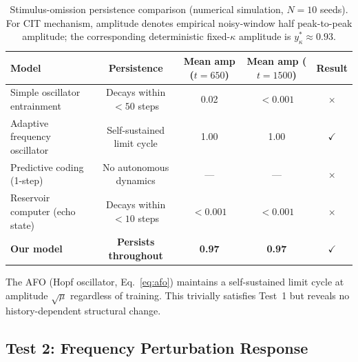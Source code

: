 \documentclass[12pt,a4paper]{article}
\begin{document}
\begin{table}[h]

\centering

\caption{Stimulus-omission persistence comparison (numerical simulation, $N=10$ seeds). For CIT mechanism, amplitude denotes empirical noisy-window half peak-to-peak amplitude; the corresponding deterministic fixed-$\kappa$ amplitude is $y_\kappa^*\approx0.93$.}

\begin{tabular}{lcccc}

\toprule

Model & Persistence & Mean amp ($t=650$) & Mean amp ($t=1500$) & Result \\

\midrule

Simple oscillator entrainment & Decays within $<50$ steps & 0.02 & $<0.001$ & $\times$ \\

Adaptive frequency oscillator \cite{righetti2009adaptive} & Self-sustained limit cycle & 1.00 & 1.00 & $\checkmark$ \\

Predictive coding (1-step) & No autonomous dynamics & — & — & $\times$ \\

Reservoir computer (echo state) & Decays within $<10$ steps & $<0.001$ & $<0.001$ & $\times$ \\

\textbf{Our model} & \textbf{Persists throughout} & \textbf{0.97} & \textbf{0.97} & $\checkmark$ \\

\bottomrule

\end{tabular}

\label{tab:omission_sim}

\end{table}



The AFO (Hopf oscillator, Eq.~\ref{eq:afo}) maintains a self-sustained limit cycle at amplitude $\sqrt{\mu}$ regardless of training. This trivially satisfies Test~1 but reveals no history-dependent structural change.



\subsection{Test 2: Frequency Perturbation Response}
\end{document}
